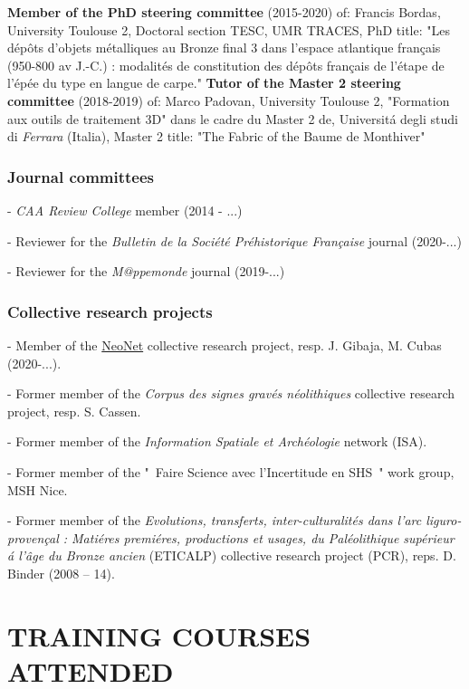 \documentclass[11pt]{report} %
\begin{document}
\textbf{Member of the PhD steering committee} (2015-2020) of: Francis Bordas, University Toulouse 2, Doctoral section TESC, UMR TRACES, PhD title: "Les d\'{e}p\^{o}ts d'objets m\'{e}talliques au Bronze final 3 dans l'espace atlantique fran\c{c}ais (950-800 av J.-C.) : modalit\'{e}s de constitution des d\'{e}p\^{o}ts fran\c{c}ais de l'\'{e}tape de l'\'{e}p\'{e}e du type en langue de carpe."
\smallbreak
\textbf{Tutor of the Master 2  steering committee} (2018-2019) of: Marco Padovan, University Toulouse 2, "Formation aux outils de traitement 3D" dans le cadre du Master 2 de, Universit\'{a} degli studi di \textit{Ferrara} (Italia), Master 2 title: "The Fabric of the Baume de Monthiver"

\subsubsection*{Journal committees}

-  \textit{CAA Review College} member (2014 - ...)

-  Reviewer for the \textit{Bulletin de la Soci\'{e}t\'{e} Pr\'{e}historique Fran\c{c}aise} journal (2020-...)

-  Reviewer for the \textit{M@ppemonde} journal (2019-...)

\subsubsection*{Collective research projects}

-  Member of the \href{https://redneonet.com/}{NeoNet} collective research project, resp. J. Gibaja, M. Cubas (2020-...).

-  Former member of the \textit{Corpus des signes grav\'{e}s n\'{e}olithiques} collective research project, resp. S. Cassen.

-  Former member of the \textit{Information Spatiale et Arch\'{e}ologie} network (ISA). 

-  Former member of the "~Faire Science avec l'Incertitude en SHS~" work group, MSH Nice.

-  Former member of the \textit{Evolutions, transferts, inter-culturalit\'{e}s dans l'arc liguro-proven\c{c}al : Mati\'{e}res premi\'{e}res, productions et usages, du Pal\'{e}olithique sup\'{e}rieur \'{a} l'\^{a}ge du Bronze ancien} (ETICALP) collective research project (PCR), reps. D. Binder (2008 -- 14).

\section*{TRAINING COURSES ATTENDED}
\end{document}
